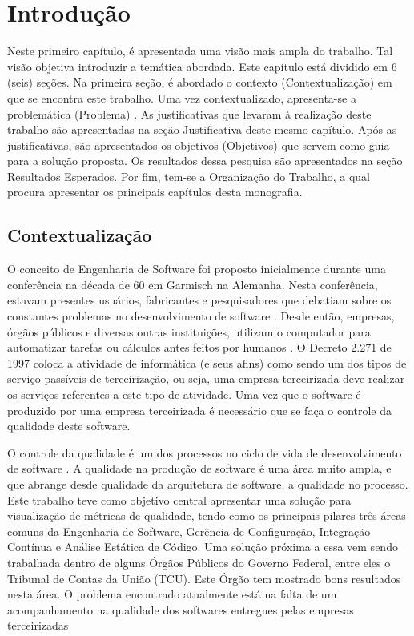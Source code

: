 \chapter[Introdução]{Introdução}
	Neste primeiro capítulo, é apresentada uma visão mais ampla do trabalho. Tal visão objetiva introduzir a temática abordada. Este capítulo está dividido em 6 (seis) seções. Na primeira seção, é abordado o contexto (Contextualização) em que se encontra este trabalho. Uma vez contextualizado, apresenta-se a problemática (Problema) . As justificativas que levaram à realização deste trabalho são apresentadas na seção Justificativa deste mesmo capítulo. Após as justificativas, são apresentados os objetivos (Objetivos) que servem como guia para a solução proposta. Os resultados dessa pesquisa  são apresentados na seção Resultados Esperados. Por fim, tem-se a Organização do Trabalho, a qual procura apresentar os principais capítulos desta monografia.


\section{Contextualização}
	O conceito de Engenharia de Software foi proposto inicialmente durante uma conferência na década de 60 em Garmisch na Alemanha. Nesta conferência, estavam presentes usuários, fabricantes e pesquisadores que debatiam sobre os constantes problemas no desenvolvimento de software \cite{Paduelli}. Desde então, empresas, órgãos públicos e diversas outras instituições, utilizam o computador para automatizar tarefas ou cálculos antes feitos por humanos \cite{fonseca2007historia}. O Decreto 2.271 de 1997 \cite{decreto_2271} coloca a atividade de informática (e seus afins) como sendo um dos tipos de serviço passíveis de terceirização, ou seja, uma empresa terceirizada deve realizar os serviços referentes a este tipo de atividade. Uma vez que o software é produzido por uma empresa terceirizada é necessário que se faça o controle da qualidade deste software.

O controle da qualidade é um dos processos no ciclo de vida de desenvolvimento de software \cite{machado_metricas_2004}. A qualidade na produção de software é uma área muito ampla, e que abrange desde qualidade da arquitetura de software, a qualidade no processo. Este trabalho teve como objetivo central apresentar uma solução para visualização de métricas de qualidade, tendo como os principais pilares três áreas comuns da Engenharia de Software, Gerência de Configuração, Integração Contínua e Análise Estática de Código. Uma solução próxima a essa vem sendo trabalhada dentro de alguns Órgãos Públicos do Governo Federal, entre eles o Tribunal de Contas da União (TCU). Este Órgão tem mostrado bons resultados nesta área. O problema encontrado atualmente está na falta de um acompanhamento na qualidade dos softwares entregues pelas empresas terceirizadas 	

